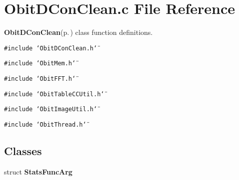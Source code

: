 \section{Obit\-DCon\-Clean.c File Reference}
\label{ObitDConClean_8c}
{\bf Obit\-DCon\-Clean}{\rm (p.\,\pageref{structObitDConClean})} class function definitions. 

{\tt \#include \char`\"{}Obit\-DCon\-Clean.h\char`\"{}}\par
{\tt \#include \char`\"{}Obit\-Mem.h\char`\"{}}\par
{\tt \#include \char`\"{}Obit\-FFT.h\char`\"{}}\par
{\tt \#include \char`\"{}Obit\-Table\-CCUtil.h\char`\"{}}\par
{\tt \#include \char`\"{}Obit\-Image\-Util.h\char`\"{}}\par
{\tt \#include \char`\"{}Obit\-Thread.h\char`\"{}}\par
\subsection*{Classes}
\begin{CompactItemize}
\item 
struct {\bf Stats\-Func\-Arg}
\end{CompactItemize}
